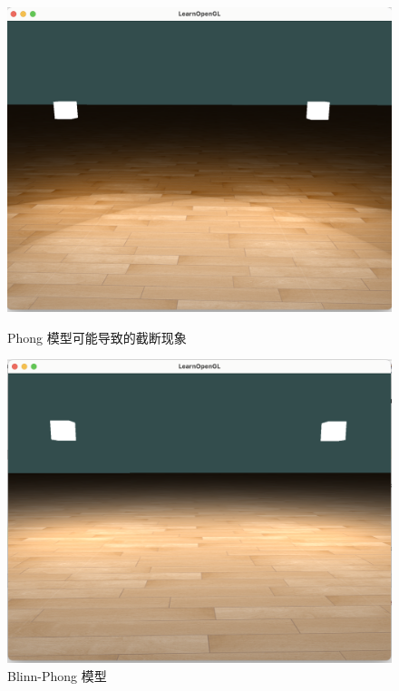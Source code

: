 \documentclass[math-font=newcm]{sjtuarticle}
\begin{document}
\begin{figure}[h]
    \centering
    \begin{minipage}{0.45\textwidth}
        \centering
        \includegraphics[width=\textwidth]{phong.png}
        \caption{Phong 模型可能导致的截断现象}
        \label{fig:phong}
    \end{minipage}
    \begin{minipage}{0.45\textwidth}
        \centering
        \includegraphics[width=\textwidth]{blinn-phong.png}
        \caption{Blinn-Phong 模型}
        \label{fig:blinn-phong}
    \end{minipage}
\end{figure}
\end{document}
